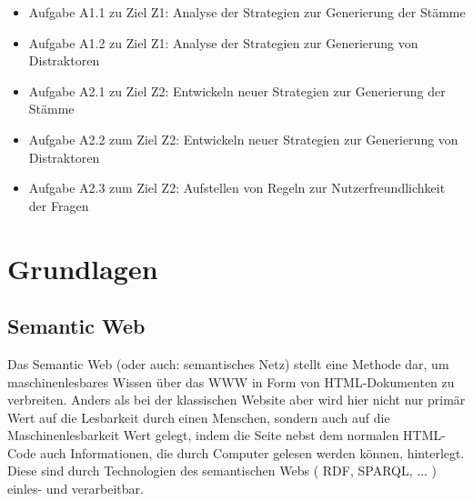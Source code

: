 \documentclass[headsepline,titlepage,ngerman,twoside,12pt]{report}
\newcommand\todo[1]{}%
\begin{document}
\todo{
Beschreiben Sie Ihre Vorgehensweise in einzelnen Schritten und stellen Sie die Reihenfolge der Abarbeitung dar.
Auf diese Punkte sollten Sie in der Diskussion wieder eingehen.
}
\todo{
\begin{enumerate}
\item Schritt
\item Schritt
\end{enumerate}
}
\todo{
Vermeiden Sie Formulierungen wie \enquote{Es ist nicht bekannt, ob...} oder \enquote{Es existiert kein...}.
Solche Formulierungen kehren in der Regel einfach das bereits angedachte Lösungsmodell um und postulieren das Fehlen der angedachten Lösung einfach als Problem.
... \\
Schritt n\\
Das ist ähnlich, wie wenn es in der Werbung hieße \enquote{Wenn Sie das Problem haben, dass Ihnen Aspirin fehlt, dann kaufen Sie doch Aspirin.}
Sinnvoller ist diese Aussage: \enquote{Wenn Sie das Problem haben, dass Ihnen der Kopf weh tut, dann kaufen Sie doch Aspirin.}
Es ist also bei der Problembeschreibung erforderlich, sich in die Lage dessen zu versetzen, den man mit der angedachten Lösung beglücken möchte.
Sein Problem ist zu ermitteln und so zu formulieren, er/sie das Problem wiedererkennt und dadurch geneigt ist, sich für die Lösung des Problems zu interessieren.
}
\begin{itemize}
    \item Aufgabe A1.1 zu Ziel Z1: Analyse der Strategien zur Generierung der Stämme
    \item Aufgabe A1.2 zu Ziel Z1: Analyse der Strategien zur Generierung von Distraktoren
    \item Aufgabe A2.1 zu Ziel Z2: Entwickeln neuer Strategien zur Generierung der Stämme
    \item Aufgabe A2.2 zum Ziel Z2: Entwickeln neuer Strategien zur Generierung von Distraktoren
    \item Aufgabe A2.3 zum Ziel Z2: Aufstellen von Regeln zur Nutzerfreundlichkeit der Fragen
\end{itemize}

\todo{(2--3 Seiten)}
\chapter{Grundlagen}
\label{ch:Grundlagen}

\section{Semantic Web}
\label{sec:semanticweb}
Das Semantic Web (oder auch: semantisches Netz) stellt eine Methode dar, um maschinenlesbares Wissen über das \ac{WWW} in Form von HTML-Dokumenten zu verbreiten.
Anders als bei der klassischen Website aber wird hier nicht nur primär Wert auf die Lesbarkeit durch einen Menschen, sondern auch auf die Maschinenlesbarkeit Wert gelegt, indem die Seite nebst dem normalen HTML-Code auch Informationen, die durch Computer gelesen werden können, hinterlegt. Diese sind durch Technologien des semantischen Webs ( \acs{RDF}, \acs{SPARQL}, ... ) einles- und verarbeitbar.
\end{document}
